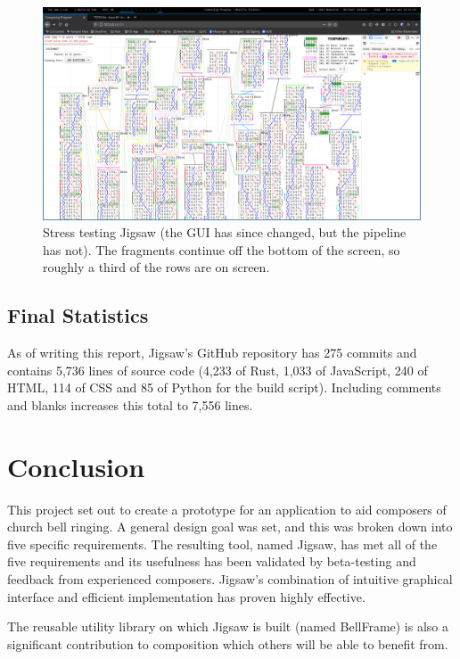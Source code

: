 \documentclass[12pt]{article}
\begin{document}
\begin{figure}
    \centering
    \includegraphics[width=\textwidth]{stress-test}
    \caption{Stress testing Jigsaw (the GUI has since changed, but the pipeline has
    not).  The fragments continue off the bottom of the screen, so roughly a third of the rows are
    on screen.}\label{fig:stress-test}
\end{figure}

\subsection{Final Statistics}

As of writing this report, Jigsaw's GitHub repository has 275 commits and contains 5,736
lines of source code (4,233 of Rust, 1,033 of JavaScript, 240 of HTML, 114 of CSS and 85 of
Python for the build script).  Including comments and blanks increases this total to 7,556 lines.



\pagebreak

\section{Conclusion}

This project set out to create a prototype for an application to aid composers of church bell
ringing.  A general design goal was set, and this was broken down into five specific requirements.
The resulting tool, named Jigsaw, has met all of the five requirements and its usefulness has been
validated by beta-testing and feedback from experienced composers. Jigsaw's combination of intuitive
graphical interface and efficient implementation has proven highly effective.

The reusable utility library on which Jigsaw is built (named BellFrame) is also a significant
contribution to composition which others will be able to benefit from.
\end{document}
